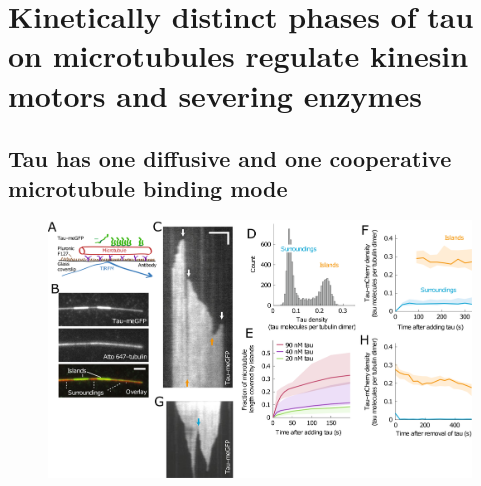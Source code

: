 \section{Kinetically distinct phases of tau on microtubules regulate kinesin motors and severing enzymes}
\label{sec:tau}
\subsection{Tau has one diffusive and one cooperative microtubule binding mode}
\begin{figure}[h!]
\centering
\includegraphics[scale=0.85]{Figures/tau1.png}
\caption[Tau on microtubules separates into two kinetically distinct phases.]{
}
\end{figure}
